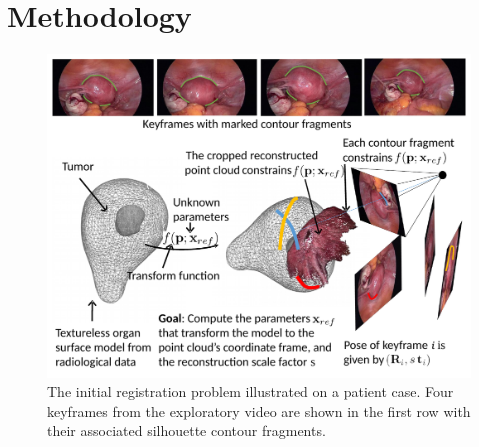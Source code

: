 





\section{Methodology}
\label{sec:ARGuidanceSystem}
\begin{figure}[t]
	\centering
	\includegraphics[width=0.9\columnwidth]{./figs/reconstructionDemoNew.pdf}
	\caption{The initial registration problem illustrated on a patient case. Four keyframes from the exploratory video are shown in the first row with their associated silhouette contour fragments.}
	\label{fig:initialRegOverview}
\end{figure}

